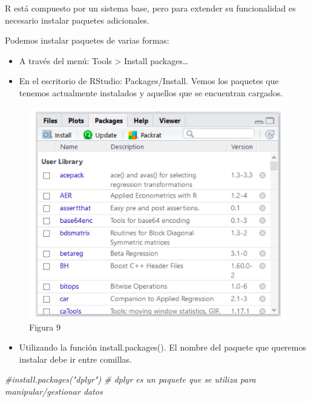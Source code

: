 \documentclass[
]{book}
\newenvironment{Shaded}{\begin{snugshade}}{\end{snugshade}}
\newcommand{\CommentTok}[1]{\textcolor[rgb]{0.56,0.35,0.01}{\textit{#1}}}
\providecommand{\tightlist}{%
  \setlength{\itemsep}{0pt}\setlength{\parskip}{0pt}}
\begin{document}
R está compuesto por un sistema base, pero para extender su funcionalidad es necesario instalar paquetes adicionales.

Podemos instalar paquetes de varias formas:

\begin{itemize}
\item
  A través del menú: Tools \textgreater{} Install packages\ldots{}
\item
  En el escritorio de RStudio: Packages/Install. Vemos los paquetes que tenemos actualmente instalados y aquellos que se encuentran cargados.
\end{itemize}

\begin{figure}
\centering
\includegraphics{imagenes/10.png}
\caption{Figura 9}
\end{figure}

\begin{itemize}
\tightlist
\item
  Utilizando la función install.packages(). El nombre del paquete que queremos instalar debe ir entre comillas.
\end{itemize}

\begin{Shaded}
\begin{Highlighting}[]
\CommentTok{\#install.packages("dplyr") \# dplyr es un paquete que se utiliza para manipular/gestionar datos}
\end{Highlighting}
\end{Shaded}
\end{document}
